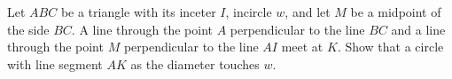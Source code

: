 Let $ABC$ be a triangle with its inceter $I$, incircle $w$, and let $M$ be a midpoint of the side $BC$. A line through the point $A$ perpendicular to the line $BC$ and a line through the point $M$ perpendicular to the line $AI$ meet at $K$. Show that a circle with line segment $AK$ as the diameter touches $w$.